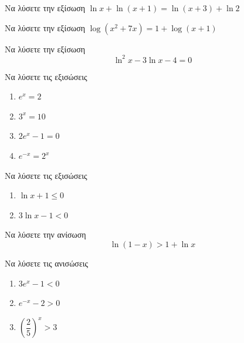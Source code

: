 \documentclass{presentation}
\begin{document}
\begin{askisi}
  Να λύσετε την εξίσωση $\ln x+\ln (x+1)=\ln (x+3)+\ln 2$


\end{askisi}

\begin{askisi}
  Να λύσετε την εξίσωση $\log (x^2+7x)=1+\log (x+1)$


\end{askisi}

\begin{askisi}
  Να λύσετε την εξίσωση $$\ln^2x-3\ln x-4=0$$


\end{askisi}

\begin{askisi}
  Να λύσετε τις εξισώσεις
  \begin{enumerate}
    \item<1-> $e^x=2$
    \item<2-> $3^x=10$
    \item<3-> $2e^x-1=0$
    \item<4-> $e^{-x}=2^x$
  \end{enumerate}


\end{askisi}

\begin{askisi}
  Να λύσετε τις εξισώσεις
  \begin{enumerate}
    \item<1-> $\ln x+1\le 0$
    \item<2-> $3\ln x-1<0$
  \end{enumerate}


\end{askisi}

\begin{askisi}
  Να λύσετε την ανίσωση $$\ln (1-x)>1+\ln x$$


\end{askisi}

\begin{askisi}
  Να λύσετε τις ανισώσεις
  \begin{enumerate}
    \item<1-> $3e^x-1<0$
    \item<2-> $e^{-x}-2>0$
    \item<3-> $\left( \dfrac{2}{5} \right)^x>3 $
  \end{enumerate}


\end{askisi}
\end{document}
